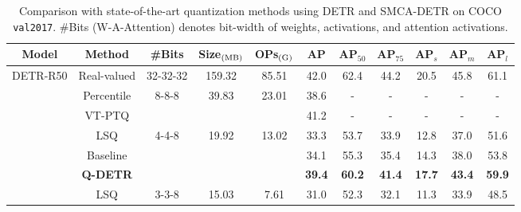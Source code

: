\documentclass[10pt,twocolumn,letterpaper]{article}
\begin{document}
\begin{table*}[!t]
\centering
\caption{Comparison with state-of-the-art quantization methods using DETR and SMCA-DETR on COCO {\tt val2017}. \#Bits (W-A-Attention) denotes bit-width of weights, activations, and attention activations.}
\begin{tabular}{ccccccccccc}
\hline
Model                           & Method          & \#Bits                 & Size$_{\rm (MB)}$        & OPs$_{\rm (G)}$          & AP & AP$_{50}$     & AP$_{75}$     & AP$_{s}$      & AP$_{m}$      & AP$_{l}$      \\ \hline
\multirow{12}{*}{DETR-R50}      & Real-valued     & 32-32-32               & 159.32                 & 85.51                  & 42.0                                                       & 62.4          & 44.2          & 20.5          & 45.8          & 61.1          \\ \cline{2-11} 
& Percentile      & \multirow{2}{*}{8-8-8} & \multirow{2}{*}{39.83} & \multirow{2}{*}{23.01} & 38.6                                                       & -             & -             & -             & -             & -             \\
& VT-PTQ          &                        &                        &                        & 41.2                                                       & -             & -             & -             & -             & -             \\ \cline{2-11} 
& LSQ             & \multirow{3}{*}{4-4-8} & \multirow{3}{*}{19.92} & \multirow{3}{*}{13.02} & 33.3                                                       & 53.7          & 33.9          & 12.8          & 37.0          & 51.6          \\
& Baseline        &                        &                        &                        & 34.1                                                       & 55.3          & 35.4          & 14.3          & 38.0          & 53.8          \\
& \textbf{Q-DETR} &                        &                        &                        & \textbf{39.4}                                              & \textbf{60.2} & \textbf{41.4} & \textbf{17.7} & \textbf{43.4} & \textbf{59.9} \\ \cline{2-11} 
& LSQ             & \multirow{3}{*}{3-3-8} & \multirow{3}{*}{15.03}  & \multirow{3}{*}{7.61}  & 31.0                                                       & 52.3          & 32.1          & 11.3          & 33.9          & 48.5          \\

\end{tabular}
\end{table*}
\end{document}
